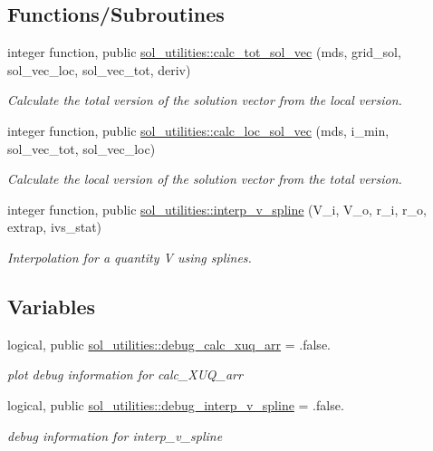 \subsection*{Functions/\+Subroutines}
\begin{DoxyCompactItemize}
\item 
integer function, public \hyperlink{namespacesol__utilities_a8b902a82ae6a238e725da2cf09e7854f}{sol\+\_\+utilities\+::calc\+\_\+tot\+\_\+sol\+\_\+vec} (mds, grid\+\_\+sol, sol\+\_\+vec\+\_\+loc, sol\+\_\+vec\+\_\+tot, deriv)
\begin{DoxyCompactList}\small\item\em Calculate the total version of the solution vector from the local version. \end{DoxyCompactList}\item 
integer function, public \hyperlink{namespacesol__utilities_a677373f47ee68ad02e9cef5b409bdc26}{sol\+\_\+utilities\+::calc\+\_\+loc\+\_\+sol\+\_\+vec} (mds, i\+\_\+min, sol\+\_\+vec\+\_\+tot, sol\+\_\+vec\+\_\+loc)
\begin{DoxyCompactList}\small\item\em Calculate the local version of the solution vector from the total version. \end{DoxyCompactList}\item 
integer function, public \hyperlink{namespacesol__utilities_a9af30f5bb948778dcafa7b80af6ea1fa}{sol\+\_\+utilities\+::interp\+\_\+v\+\_\+spline} (V\+\_\+i, V\+\_\+o, r\+\_\+i, r\+\_\+o, extrap, ivs\+\_\+stat)
\begin{DoxyCompactList}\small\item\em Interpolation for a quantity V using splines. \end{DoxyCompactList}\end{DoxyCompactItemize}
\subsection*{Variables}
\begin{DoxyCompactItemize}
\item 
logical, public \hyperlink{namespacesol__utilities_a4779ff845b4ddc046892bf4eb4490dd2}{sol\+\_\+utilities\+::debug\+\_\+calc\+\_\+xuq\+\_\+arr} = .false.
\begin{DoxyCompactList}\small\item\em plot debug information for calc\+\_\+\+X\+U\+Q\+\_\+arr \end{DoxyCompactList}\item 
logical, public \hyperlink{namespacesol__utilities_aa36c52e73c02a783074c7c0e5076c903}{sol\+\_\+utilities\+::debug\+\_\+interp\+\_\+v\+\_\+spline} = .false.
\begin{DoxyCompactList}\small\item\em debug information for interp\+\_\+v\+\_\+spline \end{DoxyCompactList}\end{DoxyCompactItemize}

